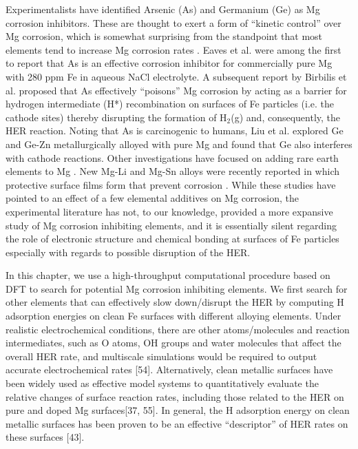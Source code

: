 Experimentalists have identified Arsenic (As) and Germanium (Ge) as Mg corrosion inhibitors. These are thought to exert a form of “kinetic control” over Mg corrosion, which is somewhat surprising from the standpoint that most elements tend to increase Mg corrosion rates \cite{liu2016controlling}. Eaves et al. \cite{eaves2012inhibition} were among the first to report that As is an effective corrosion inhibitor for commercially pure Mg with 280 ppm Fe in aqueous NaCl electrolyte. A subsequent report by Birbilis et al. \cite{birbilis2014evidence} proposed that As effectively “poisons” Mg corrosion by acting as a barrier for hydrogen intermediate (H*) recombination on surfaces of Fe particles (i.e. the cathode sites) thereby disrupting the formation of $\text{H}_2$(g) and, consequently, the \ac{HER} reaction. Noting that As is carcinogenic to humans, Liu et al. \cite{liu2016controlling,liu2018simultaneously} explored Ge and Ge-Zn metallurgically alloyed with pure Mg and found that Ge also interferes with cathode reactions. Other investigations have focused on adding rare earth elements to Mg \cite{birbilis2009corrosion,liu2009effect,shi2013corrosion}. New Mg-Li and Mg-Sn alloys were recently reported in which protective surface films form that prevent corrosion \cite{xu2015high,cain2019corrosion}. While these studies have pointed to an effect of a few elemental additives on Mg corrosion, the experimental literature has not, to our knowledge, provided a more expansive study of Mg corrosion inhibiting elements, and it is essentially silent regarding the role of electronic structure and chemical bonding at surfaces of Fe particles especially with regards to possible disruption of the \ac{HER}.

In this chapter, we use a high-throughput computational procedure based on \ac{DFT} to search for potential Mg corrosion inhibiting elements. We first search for other elements that can effectively slow down/disrupt the \ac{HER} by computing H adsorption energies on clean Fe surfaces with different alloying elements. Under realistic electrochemical conditions, there are other atoms/molecules and reaction intermediates, such as O atoms, OH groups and water molecules that affect the overall \ac{HER} rate, and multiscale simulations would be required to output accurate electrochemical rates [54]. Alternatively, clean metallic surfaces have been widely used as effective model systems to quantitatively evaluate the relative changes of surface reaction rates, including those related to the \ac{HER} on pure and doped Mg surfaces[37, 55]. In general, the H adsorption energy on clean metallic surfaces has been proven to be an effective “descriptor” of \ac{HER} rates on these surfaces [43].
